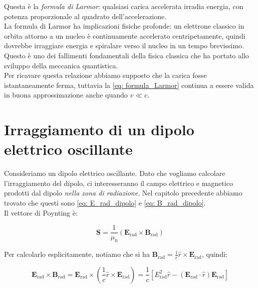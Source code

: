 Questa è la \emph{formula di Larmor}: qualsiasi carica accelerata irradia energia, con potenza proporzionale al quadrato dell'accelerazione. \\

La formula di Larmor ha implicazioni fisiche profonde: un elettrone classico in orbita attorno a un nucleo è continuamente accelerato centripetamente, quindi dovrebbe irraggiare energia e spiralare verso il nucleo in un tempo brevissimo. 
Questo è uno dei fallimenti fondamentali della fisica classica che ha portato allo sviluppo della meccanica quantistica.\\

Per ricavare questa relazione abbiamo supposto che la carica fosse istantaneamente ferma, tuttavia la \eqref{eq: formula_Larmor} continua a essere valida in buona approssimazione anche quando $v \ll c$. 


\newpage

\section{Irraggiamento di un dipolo elettrico oscillante}

Consideriamo un dipolo elettrico oscillante. Dato che vogliamo calcolare l'irraggiamento del dipolo, ci interesseranno il campo elettrico e magnetico prodotti dal dipolo \emph{nella zona di radiazione}. 
Nel capitolo precedente abbiamo trovato che questi sono \eqref{eq: E_rad_dipolo} e \eqref{eq: B_rad_dipolo}. \\

Il vettore di Poynting è:

\begin{equation}
    \mathbf{S} = \frac{1}{\mu_0}(\mathbf{E}_{\text{rad}} \times \mathbf{B}_{\text{rad}})
\end{equation}

Per calcolarlo esplicitamente, notiamo che si ha $\mathbf{B}_{\text{rad}} = \frac{1}{c}\hat{r} \times \mathbf{E}_{\text{rad}}$, quindi:

\begin{equation}
    \mathbf{E}_{\text{rad}} \times \mathbf{B}_{\text{rad}} = \mathbf{E}_{\text{rad}} \times \left(\frac{1}{c}\hat{r} \times \mathbf{E}_{\text{rad}}\right) =\frac{1}{c}\left[E_{\text{rad}}^2 \hat{r} - (\mathbf{E}_{\text{rad}} \cdot \hat{r})\mathbf{E}_{\text{rad}}\right]
\end{equation}

